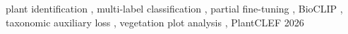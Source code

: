 \begin{keywords}
  plant identification \sep
  multi-label classification \sep
  partial fine-tuning \sep
  BioCLIP \sep
  taxonomic auxiliary loss \sep
  vegetation plot analysis \sep
  PlantCLEF 2026
\end{keywords}
